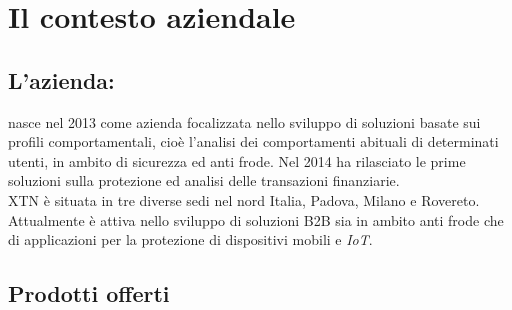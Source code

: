 
\chapter{Il contesto aziendale}
\label{cap:processi-metodologie}

\section{L'azienda: \textbf{\azienda}}
\textbf{\azienda} nasce nel 2013 come azienda focalizzata nello sviluppo di soluzioni basate sui profili comportamentali, cioè l'analisi dei comportamenti abituali di determinati utenti, in ambito di sicurezza ed anti frode. Nel 2014 ha rilasciato le prime soluzioni sulla protezione ed analisi delle transazioni finanziarie.\\
XTN è situata in tre diverse sedi nel nord Italia, Padova, Milano e Rovereto. Attualmente è attiva  nello sviluppo di soluzioni \gls{B2B} sia in ambito anti frode che di applicazioni per la protezione di dispositivi mobili e \textit{IoT}.\\
  
\section{Prodotti offerti}

